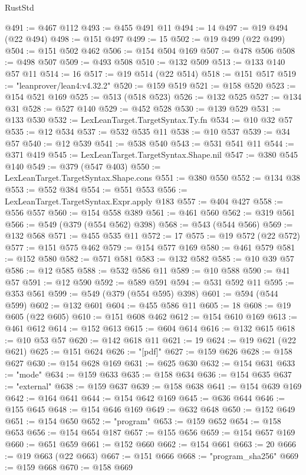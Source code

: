 \begin{lexlean}{RustStd}
\begin{coremodule}
@491 := @467 @112
@493 := @455 @491 @11
@494 := 14
@497 := @19 @494 (@22 @494)
@498 := @151 @497
@499 := 15
@502 := @19 @499 (@22 @499)
@504 := @151 @502 @462
@506 := @154 @504 @169
@507 := @478 @506
@508 := @498 @507
@509 := @493 @508
@510 := @132 @509
@513 := @133 @140 @57 @11
@514 := 16
@517 := @19 @514 (@22 @514)
@518 := @151 @517
@519 := "leanprover/lean4:v4.32.2"
@520 := @159 @519
@521 := @158 @520
@523 := @154 @521 @169
@525 := @513 (@518 @523)
@526 := @132 @525
@527 := @134 @31
@528 := @527 @140
@529 := @452 @528
@530 := @139 @529
@531 := @133 @530
@532 := LexLeanTarget.TargetSyntax.Ty.fn
@534 := @10 @32 @57
@535 := @12 @534
@537 := @532 @535 @11
@538 := @10 @537
@539 := @34 @57
@540 := @12 @539
@541 := @538 @540
@543 := @531 @541 @11
@544 := @371 @419
@545 := LexLeanTarget.TargetSyntax.Shape.nil
@547 := @380 @545 @140
@549 := @379 (@547 @403)
@550 := LexLeanTarget.TargetSyntax.Shape.cons
@551 := @380 @550
@552 := @134 @38
@553 := @552 @384
@554 := @551 @553
@556 := LexLeanTarget.TargetSyntax.Expr.apply @183
@557 := @404 @427
@558 := @556 @557
@560 := @154 @558 @389
@561 := @461 @560
@562 := @319 @561
@566 := @549 (@379 (@554 @562) @398)
@568 := @543 (@544 @566)
@569 := @132 @568
@571 := @455 @535 @11
@572 := 17
@575 := @19 @572 (@22 @572)
@577 := @151 @575 @462
@579 := @154 @577 @169
@580 := @461 @579
@581 := @152 @580
@582 := @571 @581
@583 := @132 @582
@585 := @10 @39 @57
@586 := @12 @585
@588 := @532 @586 @11
@589 := @10 @588
@590 := @41 @57
@591 := @12 @590
@592 := @589 @591
@594 := @531 @592 @11
@595 := @353 @561
@599 := @549 (@379 (@554 @595) @398)
@601 := @594 (@544 @599)
@602 := @132 @601
@604 := @455 @586 @11
@605 := 18
@608 := @19 @605 (@22 @605)
@610 := @151 @608 @462
@612 := @154 @610 @169
@613 := @461 @612
@614 := @152 @613
@615 := @604 @614
@616 := @132 @615
@618 := @10 @53 @57
@620 := @142 @618 @11
@621 := 19
@624 := @19 @621 (@22 @621)
@625 := @151 @624
@626 := "[pdf]"
@627 := @159 @626
@628 := @158 @627
@630 := @154 @628 @169
@631 := @625 @630
@632 := @154 @631
@633 := "mode"
@634 := @159 @633
@635 := @158 @634
@636 := @154 @635
@637 := "external"
@638 := @159 @637
@639 := @158 @638
@641 := @154 @639 @169
@642 := @164 @641
@644 := @154 @642 @169
@645 := @636 @644
@646 := @155 @645
@648 := @154 @646 @169
@649 := @632 @648
@650 := @152 @649
@651 := @154 @650
@652 := "program"
@653 := @159 @652
@654 := @158 @653
@656 := @154 @654 @187
@657 := @155 @656
@659 := @154 @657 @169
@660 := @651 @659
@661 := @152 @660
@662 := @154 @661
@663 := 20
@666 := @19 @663 (@22 @663)
@667 := @151 @666
@668 := "program_sha256"
@669 := @159 @668
@670 := @158 @669

\end{coremodule}
\end{lexlean}
